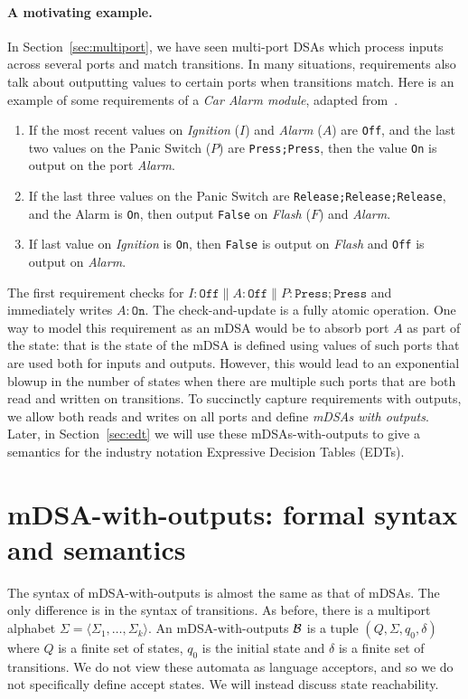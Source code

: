 



\paragraph*{A motivating example.} In Section~\ref{sec:multiport}, we have seen multi-port DSAs which process inputs across several ports and match transitions. In many situations, requirements also talk about outputting values to certain ports when transitions match. Here is an example of some requirements of a \emph{Car Alarm module}, adapted from~\cite{DBLP:conf/enase/VenkateshSZA15a}. 
\begin{enumerate}
\item If the most recent values on \emph{Ignition} ($I$) and \emph{Alarm} ($A$) are \texttt{Off}, and the last two values on the Panic Switch ($P$) are \texttt{Press;Press}, then the value \texttt{On} is output on the port \emph{Alarm}.

\item If the last three values on the Panic Switch are \texttt{Release;Release;Release}, and the Alarm is \texttt{On}, then output \texttt{False} on \emph{Flash} ($F$)
and \emph{Alarm}.

\item If last value on \emph{Ignition} is \texttt{On}, then \texttt{False} is output on \emph{Flash} and \texttt{Off} is output on \emph{Alarm}.
\end{enumerate}

The first requirement checks for $I:\mathtt{Off} \parallel A:\mathtt{Off} \parallel P:\mathtt{Press;Press}$ and immediately writes $A: \mathtt{On}$. The check-and-update is a fully atomic operation. One way to model this requirement as an mDSA would be to absorb port $A$ as part of the state: that is the state of the mDSA is defined using values of such ports that are used both for inputs and outputs. However, this would lead to an exponential blowup in the number of states when there are multiple such ports that are both read and written on transitions. To succinctly capture requirements with outputs, we allow both reads and writes on all ports and define \emph{mDSAs with outputs}. Later, in Section~\ref{sec:edt} we will use these mDSAs-with-outputs to give a semantics for the industry notation Expressive Decision Tables (EDTs).

\section{mDSA-with-outputs: formal syntax and semantics}
\label{sec:mdsao-synt}
The syntax of mDSA-with-outputs is almost the same as that of mDSAs. The only difference is in the syntax of transitions.  As before, there is a multiport alphabet $\Sigma = \langle \Sigma_1, \dots, \Sigma_k \rangle$. An mDSA-with-outputs $\mathcal{B}$ is a tuple $(Q, \Sigma, q_0, \delta)$ where $Q$ is a finite set of states, $q_0$ is the initial state and $\delta$ is a finite set of transitions. We do not view these automata as language acceptors, and so we do not specifically define accept states. We will instead discuss  state reachability. 


